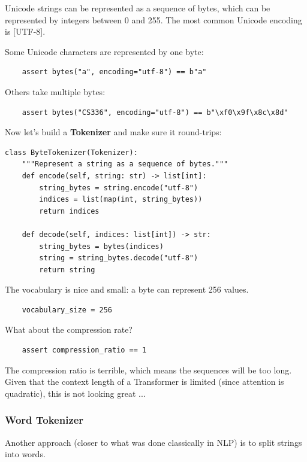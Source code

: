\documentclass[12pt,twoside]{article}
\begin{document}
Unicode strings can be represented as a sequence of bytes, which can be represented by integers between 0 and 255. The most common Unicode encoding is [UTF-8].

Some Unicode characters are represented by one byte:

\begin{verbatim}
    assert bytes("a", encoding="utf-8") == b"a"
\end{verbatim}

Others take multiple bytes:

\begin{verbatim}
    assert bytes("CS336", encoding="utf-8") == b"\xf0\x9f\x8c\x8d"
\end{verbatim}

Now let's build a \textbf{Tokenizer} and make sure it round-trips:

\begin{verbatim}
class ByteTokenizer(Tokenizer):
    """Represent a string as a sequence of bytes."""
    def encode(self, string: str) -> list[int]:
        string_bytes = string.encode("utf-8")  
        indices = list(map(int, string_bytes))  
        return indices
    
    def decode(self, indices: list[int]) -> str:
        string_bytes = bytes(indices)  
        string = string_bytes.decode("utf-8")  
        return string
\end{verbatim}

The vocabulary is nice and small: a byte can represent 256 values.

\begin{verbatim}
    vocabulary_size = 256
\end{verbatim}

What about the compression rate?

\begin{verbatim}
    assert compression_ratio == 1
\end{verbatim}

The compression ratio is terrible, which means the sequences will be too long. Given that the context length of a Transformer is limited (since attention is quadratic), this is not looking great ...

\subsubsection*{Word Tokenizer}

Another approach (closer to what was done classically in NLP) is to split strings into words.
\end{document}
